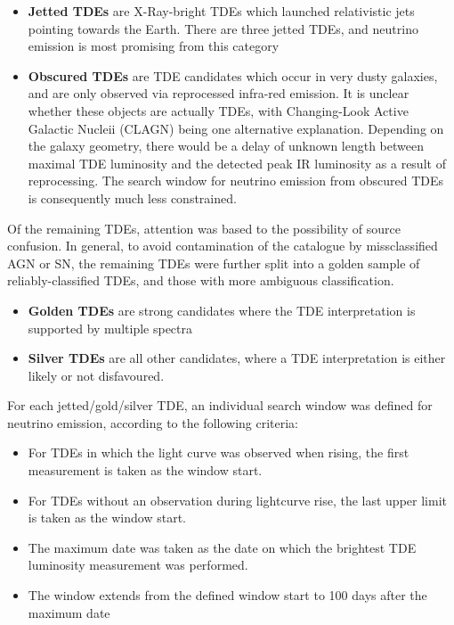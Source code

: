 \documentclass[twocolumn, tighten, linenumbers]{aastex62}
\begin{document}
\begin{itemize}
	\item \textbf{Jetted TDEs} are X-Ray-bright TDEs which launched relativistic jets pointing towards the Earth. There are three jetted TDEs, and neutrino emission is most promising from this category
	
	\item \textbf{Obscured TDEs} are TDE candidates which occur in very dusty galaxies, and are only observed via reprocessed infra-red emission. It is unclear whether these objects are actually TDEs, with Changing-Look Active Galactic Nucleii (CLAGN) being one alternative explanation. Depending on the galaxy geometry, there would be a delay of unknown length between maximal TDE luminosity and the detected peak IR luminosity as a result of  reprocessing. The search window for neutrino emission from obscured TDEs is consequently much less constrained.
\end{itemize}
Of the remaining TDEs, attention was based to the possibility of source confusion. In general, to avoid contamination of the catalogue by missclassified AGN or SN, the remaining TDEs were further split into a golden sample of reliably-classified TDEs, and those with more ambiguous classification.
\begin{itemize}
	\item \textbf{Golden TDEs} are strong candidates where the TDE interpretation is supported by multiple spectra
	\item \textbf{Silver TDEs} are all other candidates, where a TDE interpretation is either likely or not disfavoured.
\end{itemize}

For each jetted/gold/silver TDE, an individual search window was defined for neutrino emission, according to the following criteria:

\begin{itemize}
	\item For TDEs in which the light curve was observed when rising, the first measurement is taken as the window start.
	
	\item For TDEs without an observation during lightcurve rise, the last upper limit is taken as the window start.
	
	\item The maximum date was taken as the date on which the brightest TDE luminosity measurement was performed.
	
	\item The window extends from the defined window start to 100 days after the maximum date
	
\end{itemize}
\end{document}
